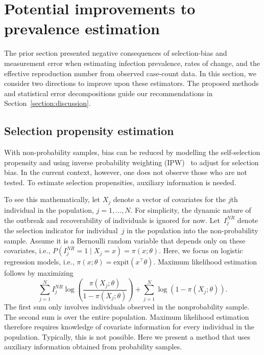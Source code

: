 \documentclass[11pt]{amsart}
\numberwithin{equation}{section}
\theoremstyle{plain}
\begin{document}
 \section{Potential improvements to prevalence estimation}
 \label{section:improvedcasecount}

 The prior section presented negative consequences of selection-bias and measurement error when estimating infection prevalence, rates of change, and the effective reproduction number from observed case-count data.  In this section, we consider two directions to improve upon these estimators.
 The proposed methods and statistical error decompositions guide our recommendations in Section~\ref{section:discussion}.

 \subsection{Selection propensity estimation}

 With non-probability samples, bias can be reduced by modelling the self-selection propensity and using inverse probability weighting (IPW)~\citep{Elliott2017} to adjust for selection bias.
 In the current context, however, one does not observe those who are not tested.  To estimate selection propensities, auxiliary information is needed.

 To see this mathematically, let $X_j$ denote a vector of covariates for the $j$th individual in the population, $j=1,\ldots,N$.  For simplicity, the dynamic nature of the outbreak and recoverability of individuals is ignored for now. Let~$I_j^{NR}$ denote the selection indicator for individual~$j$ in the population into the non-probability sample.  Assume it is a Bernoulli random variable that depends only on these covariates, i.e., $P(I^{NR}_j = 1 \mid X_j = x) = \pi (x; \theta)$. Here, we focus on logistic regression models, i.e., $\pi(x; \theta) = \text{expit} \left( x^\top \theta \right)$. Maximum likelihood estimation follows by maximizing
 \begin{equation}
 \label{eq:propensity}
 \sum_{j=1}^N I_j^{NR} \log \left( \frac{\pi (X_j; \theta)}{1-\pi(X_j; \theta)} \right) + \sum_{j=1}^N \log \left( 1 - \pi (X_j; \theta) \right).
 \end{equation}
 The first sum only involves individuals observed in the nonprobability sample.
 The second sum is over the entire population.  Maximum likelihood estimation therefore requires knowledge of covariate information for every individual in the population.  Typically, this is not possible.  Here we present a method that uses auxiliary information obtained from probability samples.
\end{document}
